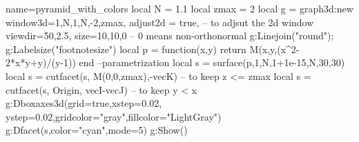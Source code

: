 \documentclass[10pt]{standalone}%
\begin{document}
\begin{luadraw}{name=pyramid_with_colors}
local N = 1.1
local zmax = 2
local g = graph3d:new{ 
    window3d={1,N,1,N,-2,zmax},
    adjust2d = true, -- to adjsut the 2d window
    viewdir={50,2.5}, 
    size={10,10,0} -- 0 means non-orthonormal
}
g:Linejoin("round"); g:Labelsize("footnotesize")
local p = function(x,y) return M(x,y,(x^2-2*x*y+y)/(y-1)) end  --parametrization
local s = surface(p,1,N,1+1e-15,N,{30,30})
local s = cutfacet(s, {M(0,0,zmax),-vecK}) -- to keep z <= zmax
local s = cutfacet(s, {Origin, vecI-vecJ}) -- to keep y < x
g:Dboxaxes3d({grid=true,xstep=0.02, ystep=0.02,gridcolor="gray",fillcolor="LightGray"})
g:Dfacet(s,{color="cyan",mode=5})
g:Show() 
\end{luadraw}
\end{document}
